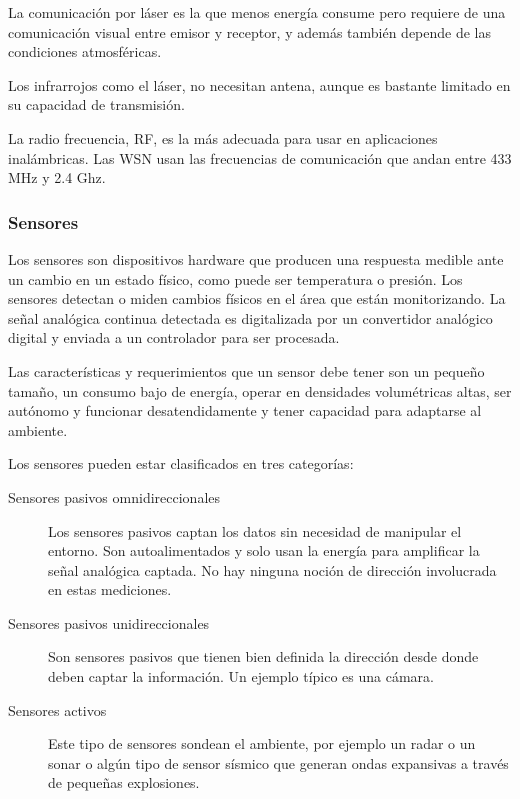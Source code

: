 La comunicaci\'on por l\'aser es la que menos energ\'ia consume pero requiere de una comunicaci\'on visual entre emisor y
receptor, y adem\'as tambi\'en depende de las condiciones atmosf\'ericas. 

Los infrarrojos como el l\'aser, no necesitan antena, aunque es bastante limitado en su capacidad de transmisi\'on. 

La radio frecuencia, RF, es la m\'as adecuada para usar en aplicaciones inal\'ambricas. Las WSN usan las frecuencias de
comunicaci\'on que andan entre 433 MHz y 2.4 Ghz.

\subsubsection{Sensores}
Los sensores son dispositivos hardware que producen una respuesta medible ante un cambio en un estado f\'isico, como puede
ser temperatura o presi\'on. Los sensores detectan o miden cambios f\'isicos en el \'area que est\'an monitorizando. La se\~nal
anal\'ogica continua detectada es digitalizada por un convertidor anal\'ogico digital y enviada a un controlador para ser
procesada.

Las caracter\'isticas y requerimientos que un sensor debe tener son un peque\~no tama\~no, un consumo bajo de energ\'ia, operar
en densidades volum\'etricas altas, ser aut\'onomo y funcionar desatendidamente y tener capacidad para adaptarse al
ambiente. 

Los sensores pueden estar clasificados en tres categor\'ias: 

\begin{description}
\item [Sensores pasivos omnidireccionales]
 Los sensores pasivos captan los datos sin necesidad de manipular el entorno.
Son autoalimentados y solo usan la energ\'ia para amplificar la se\~nal anal\'ogica captada. No hay ninguna noci\'on de direcci\'on involucrada en estas mediciones.

\item [Sensores pasivos unidireccionales] 
Son sensores pasivos que tienen bien definida la direcci\'on desde donde deben
captar la informaci\'on. Un ejemplo t\'ipico es una c\'amara. 

\item [Sensores activos] Este tipo de sensores sondean el ambiente, por ejemplo un radar o un sonar o alg\'un tipo de
sensor s\'ismico que generan ondas expansivas a trav\'es de peque\~nas explosiones.
\end{description}

